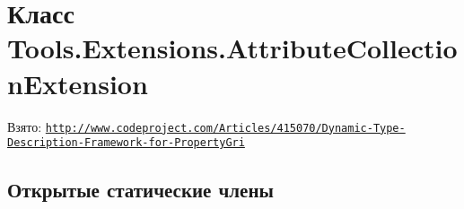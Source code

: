 \hypertarget{class_tools_1_1_extensions_1_1_attribute_collection_extension}{}\section{Класс Tools.\+Extensions.\+Attribute\+Collection\+Extension}
\label{class_tools_1_1_extensions_1_1_attribute_collection_extension}


Взято\+: \href{http://www.codeproject.com/Articles/415070/Dynamic-Type-Description-Framework-for-PropertyGri}{\tt http\+://www.\+codeproject.\+com/\+Articles/415070/\+Dynamic-\/\+Type-\/\+Description-\/\+Framework-\/for-\/\+Property\+Gri}  


\subsection*{Открытые статические члены}
